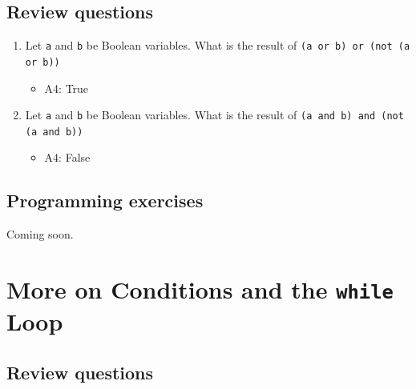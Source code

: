 \documentclass[article,A4,12pt]{llncs}
\begin{document}
\subsection{Review questions}

\begin{enumerate}
\item Let {\tt a} and {\tt b} be Boolean variables. What is the 
result of {\tt (a or b) or (not (a or b))}
  \begin{itemize}
    \item A4: True
  \end{itemize}
\item Let {\tt a} and {\tt b} be Boolean variables. What is the 
result of {\tt (a and b) and (not (a and b))}
  \begin{itemize}
    \item A4: False
  \end{itemize}
\end{enumerate}

\subsection{Programming exercises}

Coming soon.


\section{More on Conditions and the {\tt while} Loop}

\subsection{Review questions}
\end{document}

